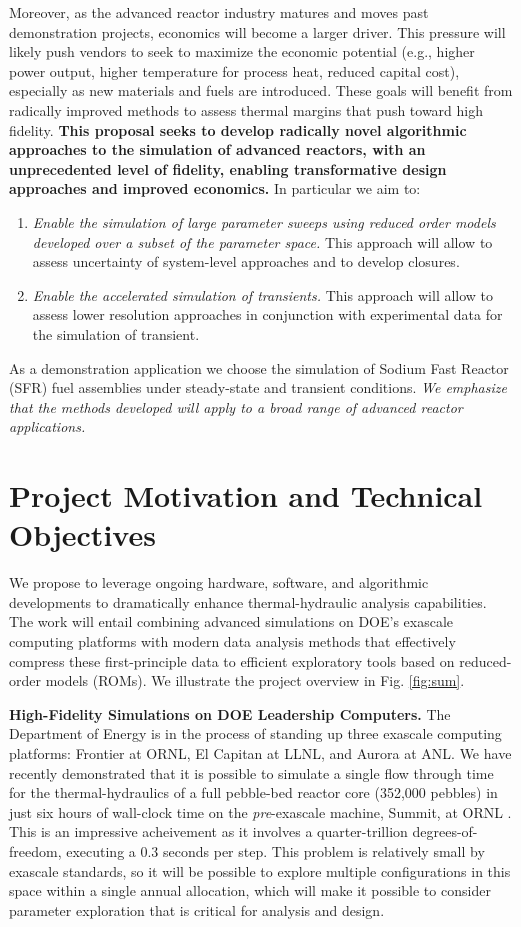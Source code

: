 Moreover, as the advanced reactor industry matures and moves past demonstration
projects, economics will become a larger driver. This pressure will likely push
vendors to seek to maximize the economic potential (e.g., higher power output,
higher temperature for process heat, reduced capital cost), especially as new
materials and fuels are introduced. These goals will benefit from radically
improved methods to assess thermal margins that push toward high fidelity.
\textbf{This proposal seeks to develop radically novel algorithmic approaches
to the simulation of advanced reactors, with an unprecedented level of
fidelity, enabling transformative design approaches and improved economics.} In
particular we aim to: 
\begin{enumerate}
%
   \item \textit{Enable the simulation of large parameter sweeps using reduced
   order models developed over a subset of the parameter space.} This approach
   will allow to assess uncertainty of system-level approaches and to develop
   closures.
%
   \item \textit{Enable the accelerated simulation of transients.}
   This approach will allow to assess lower resolution approaches in conjunction
   with experimental data for the simulation of transient.  
\end{enumerate}
As a demonstration application we choose the simulation of Sodium Fast Reactor
(SFR) fuel assemblies under steady-state and transient conditions. \textit{We
emphasize that the methods developed will apply to a broad range of advanced
reactor applications.}

\section{Project Motivation and Technical Objectives}

We propose to leverage ongoing hardware, software, and algorithmic developments
to dramatically enhance thermal-hydraulic analysis capabilities.  The work will
entail combining advanced simulations on DOE's exascale computing platforms
with modern data analysis methods that effectively compress these
first-principle data to efficient exploratory tools based on reduced-order
models (ROMs).
We illustrate the project overview in Fig. \ref{fig:sum}.

\noindent
{\bf High-Fidelity Simulations on DOE Leadership Computers.}
The Department of Energy is in the process of standing up three exascale
computing platforms: Frontier at ORNL, El Capitan at LLNL, and Aurora at ANL.
We have recently demonstrated that it is possible to simulate a single flow
through time for the thermal-hydraulics of a full pebble-bed reactor core
(352,000 pebbles) in just six hours of wall-clock time on the {\em
pre}-exascale machine, Summit, at ORNL \cite{sc22}.   This is an impressive
acheivement as it involves a quarter-trillion degrees-of-freedom, executing a
0.3 seconds per step.  This problem is relatively small by exascale standards,
so it will be possible to explore multiple configurations in this space within
a single annual allocation, which will make it possible to consider parameter
exploration that is critical for analysis and design.

